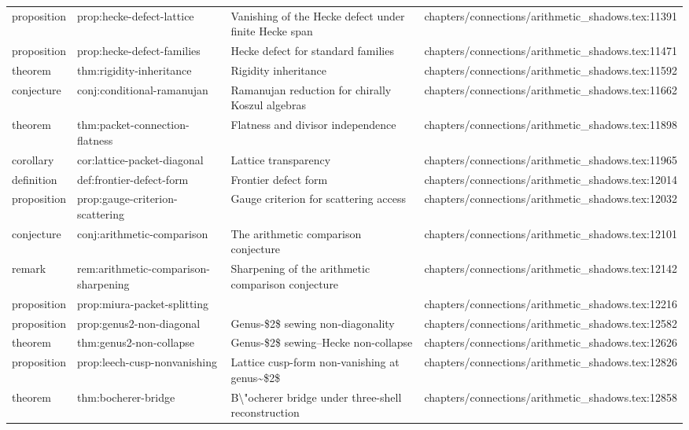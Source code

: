 \documentclass[11pt]{article}
\begin{document}
\begin{longtable}{L{0.10\textwidth}L{0.26\textwidth}L{0.42\textwidth}L{0.22\textwidth}}
proposition & prop:hecke-defect-lattice & Vanishing of the Hecke defect under finite Hecke span & chapters/connections/arithmetic\_shadows.tex:11391\\
proposition & prop:hecke-defect-families & Hecke defect for standard families & chapters/connections/arithmetic\_shadows.tex:11471\\
theorem & thm:rigidity-inheritance & Rigidity inheritance & chapters/connections/arithmetic\_shadows.tex:11592\\
conjecture & conj:cond{}itional-ramanujan & Ramanujan reduction for chirally Koszul algebras & chapters/connections/arithmetic\_shadows.tex:11662\\
theorem & thm:packet-connection-flatness & Flatness and divisor independence & chapters/connections/arithmetic\_shadows.tex:11898\\
corollary & cor:lattice-packet-diagonal & Lattice transparency & chapters/connections/arithmetic\_shadows.tex:11965\\
definition & def:frontier-defect-form & Frontier defect form & chapters/connections/arithmetic\_shadows.tex:12014\\
proposition & prop:gauge-criterion-scattering & Gauge criterion for scattering access & chapters/connections/arithmetic\_shadows.tex:12032\\
conjecture & conj:arithmetic-comparison & The arithmetic comparison conjecture & chapters/connections/arithmetic\_shadows.tex:12101\\
remark & rem:arithmetic-comparison-sharpening & Sharpening of the arithmetic comparison conjecture & chapters/connections/arithmetic\_shadows.tex:12142\\
proposition & prop:miura-packet-splitting &  & chapters/connections/arithmetic\_shadows.tex:12216\\
proposition & prop:genus2-non-diagonal & Genus-\$2\$ sewing non-diagonality & chapters/connections/arithmetic\_shadows.tex:12582\\
theorem & thm:genus2-non-collapse & Genus-\$2\$ sewing--Hecke non-collapse & chapters/connections/arithmetic\_shadows.tex:12626\\
proposition & prop:leech-cusp-nonvanishing & Lattice cusp-form non-vanishing at genus\textasciitilde{}\$2\$ & chapters/connections/arithmetic\_shadows.tex:12826\\
theorem & thm:bocherer-bridge & B\textbackslash{}"ocherer bridge under three-shell reconstruction & chapters/connections/arithmetic\_shadows.tex:12858\\

\end{longtable}
\end{document}
